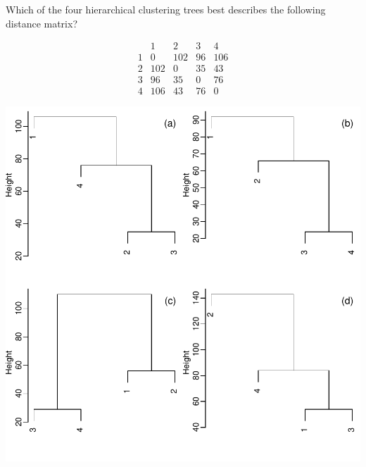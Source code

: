 \documentclass{article}
\begin{document}
\begin{minipage}{10cm}

Which of the four hierarchical clustering trees best describes the
following distance matrix?

\[
\begin{array}{c|cccc}
  & 1 & 2 & 3 & 4 \\ \hline
  1 & 0 & 102 & 96 & 106 \\
  2 & 102 & 0 & 35 & 43 \\
  3 & 96 & 35 & 0 & 76 \\
  4 & 106 & 43 & 76 & 0
\end{array}
\]

\includegraphics[width=\linewidth]{unsupervised-hclust.pdf}

\end{minipage}
\end{document}
